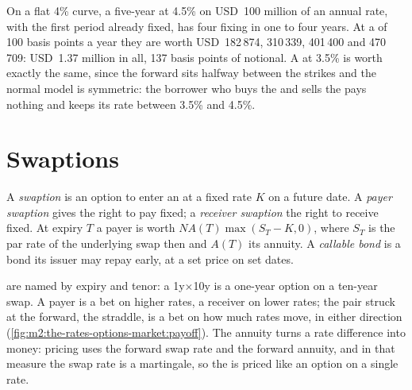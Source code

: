 \begin{example}\label{ex:m2:the-rates-options-market:cap}
On a flat 4\% curve, a five-year  at 4.5\% on USD~100 million of an annual
rate, with the first period already fixed, has four  fixing in one to
four years. At a  of 100 basis points a year they are worth
USD~182\,874, 310\,339, 401\,400 and 470\,709: USD~1.37 million in all, 137
basis points of notional. A  at 3.5\% is worth exactly the same, since the
forward sits halfway between the strikes and the normal model is symmetric: the
borrower who buys the  and sells the  pays nothing and keeps its rate
between 3.5\% and 4.5\%.
\end{example}

\section{Swaptions}

\begin{definition}\label{def:m2:the-rates-options-market:swaption}
A \emph{swaption} is an option to enter an 
at a fixed rate $K$ on a future date. A \emph{payer
swaption} gives the right to pay fixed; a
\emph{receiver swaption} the right to receive fixed.
At expiry $T$ a payer is worth $N A(T)\max(S_T - K, 0)$, where $S_T$ is the par
rate of the underlying swap then and $A(T)$ its annuity. A \emph{callable
bond} is a bond its issuer may repay early, at a set price
on set dates.
\end{definition}

 are named by expiry and tenor: a 1y$\times$10y is a one-year option on
a ten-year swap. A payer is a bet on higher rates, a receiver on lower rates;
the pair struck at the forward, the straddle, is a bet on how much rates move,
in either direction (\cref{fig:m2:the-rates-options-market:payoff}). The
annuity turns a rate difference into money: pricing uses the forward swap rate
and the forward annuity, and in that measure the swap rate is a martingale, so
the  is priced like an option on a single rate.


